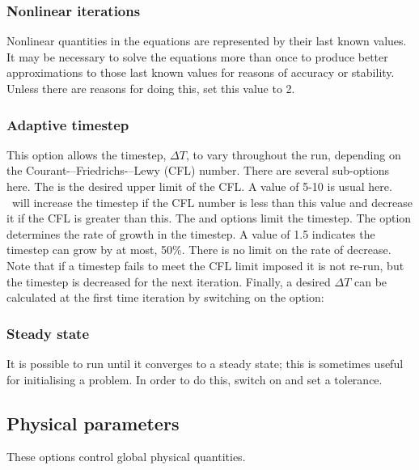 \subsubsection{Nonlinear iterations}
Nonlinear quantities in the equations are represented by their last known
values. It may be necessary to solve the equations more than once to produce
better approximations to those last known values for reasons of accuracy or
stability. Unless there are reasons for doing this, set this value to 2.

\subsubsection{Adaptive timestep}

This option allows the timestep, $\Delta T$, to vary throughout the run, depending on the 
Courant-–Friedrichs-–Lewy (CFL) number.  There are several sub-options here. The
 is the desired upper limit of the CFL. A value of 5-10 is usual
here. \fluidity\ will increase the timestep if the CFL number is less than this value and decrease
it if the CFL is greater than this. The  and 
 options limit the timestep. The option 
 determines
the rate of growth in the timestep. A value of 1.5 indicates the timestep can grow by
at most, 50\%. There is no limit on the rate of decrease. Note that if a timestep fails
to meet the CFL limit imposed it is not re-run, but the timestep is decreased for the next
iteration. Finally, a desired $\Delta T$ can be calculated at the first time iteration by
switching on the option: 

\subsubsection{Steady state}
It is possible to run \fluidity until it converges to a steady state; this is sometimes useful for initialising a problem. In order to do this, switch on  and set a tolerance. 

\subsection{Physical parameters}
These options control global physical quantities.

